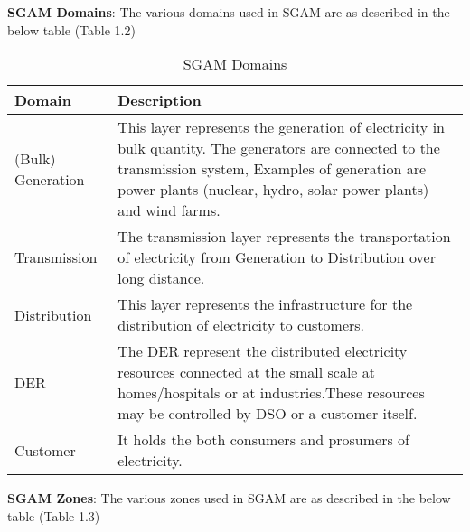 \documentclass{article}
\begin{document}
\textbf{SGAM Domains}: The various domains used in SGAM are as described in the below table (Table 1.2)


\begin{table}[h!t]
	\centering
	\begin{tabular} { | l | p{11cm} | }
		\hline
		\textbf{Domain} & \textbf{Description} \\ 
		\hline
		(Bulk) Generation & This layer represents the generation of electricity in bulk quantity. The
		generators are connected to the transmission system, Examples of
		generation are power plants (nuclear, hydro, solar power plants) and wind
		farms. \\ 
		\hline
		Transmission & The transmission layer represents the transportation of electricity from
		Generation to Distribution over long distance. \\ 
		\hline
		Distribution & This layer represents the infrastructure for the distribution of electricity to
		customers.\\ 
		\hline
		DER & The DER represent the distributed electricity resources connected at the
		small scale at homes/hospitals or at industries.These resources may be
		controlled by DSO or a customer itself. \\ 
		\hline
		Customer & It holds the both consumers and prosumers of electricity. \\ 
		\hline
		
	\end{tabular}
	\caption{SGAM Domains}
	\label{table:2} 
\end{table}

\textbf{SGAM Zones}: The various zones used in SGAM are as described in the below table (Table 1.3)
\end{document}
